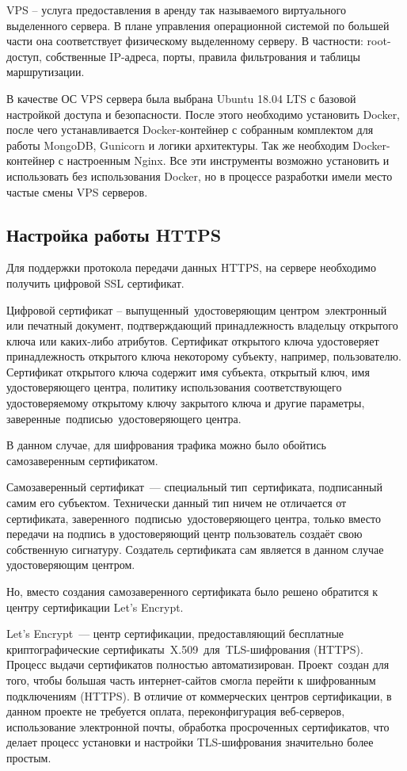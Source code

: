 \documentclass[14pt,a4paper,openbib]{extarticle}
\numberwithin{equation}{section}
\begin{document}
VPS – услуга предоставления в аренду так называемого виртуального выделенного сервера. В плане управления операционной системой по большей части она соответствует физическому выделенному серверу. В частности: root-доступ, собственные IP-адреса, порты, правила фильтрования и таблицы маршрутизации.

В качестве ОС VPS сервера была выбрана Ubuntu 18.04 LTS с базовой настройкой доступа и безопасности. После этого необходимо установить Docker, после чего устанавливается Docker-контейнер с собранным комплектом для работы MongoDB, Gunicorn и логики архитектуры. Так же необходим Docker-контейнер с настроенным Nginx. Все эти инструменты возможно установить и использовать без использования Docker, но в процессе разработки имели место частые смены VPS серверов.


\newpage
\subsection{Настройка работы HTTPS}
Для поддержки протокола передачи данных HTTPS, на сервере необходимо получить цифровой SSL сертификат.

Цифровой сертификат – выпущенный удостоверяющим центром электронный или печатный документ, подтверждающий принадлежность владельцу открытого ключа или каких-либо атрибутов. Сертификат открытого ключа удостоверяет принадлежность открытого ключа некоторому субъекту, например, пользователю. Сертификат открытого ключа содержит имя субъекта, открытый ключ, имя удостоверяющего центра, политику использования соответствующего удостоверяемому открытому ключу закрытого ключа и другие параметры, заверенные подписью удостоверяющего центра.

В данном случае, для шифрования трафика можно было обойтись самозаверенным сертификатом.

Самозаверенный сертификат — специальный тип сертификата, подписанный самим его субъектом. Технически данный тип ничем не отличается от сертификата, заверенного подписью удостоверяющего центра, только вместо передачи на подпись в удостоверяющий центр пользователь создаёт свою собственную сигнатуру. Создатель сертификата сам является в данном случае удостоверяющим центром.

Но, вместо создания самозаверенного сертификата было решено обратится к центру сертификации Let’s Encrypt.

Let’s Encrypt — центр сертификации, предоставляющий бесплатные криптографические сертификаты X.509 для TLS-шифрования (HTTPS). Процесс выдачи сертификатов полностью автоматизирован. Проект создан для того, чтобы большая часть интернет-сайтов смогла перейти к шифрованным подключениям (HTTPS). В отличие от коммерческих центров сертификации, в данном проекте не требуется оплата, переконфигурация веб-серверов, использование электронной почты, обработка просроченных сертификатов, что делает процесс установки и настройки TLS-шифрования значительно более простым.
\end{document}
